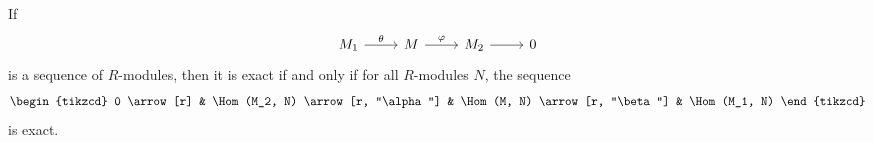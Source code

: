 If
\[\begin{tikzcd}
M_1 \arrow[r, "\theta"] & M \arrow[r, "\varphi"] & M_2 \arrow[r] & 0
\end{tikzcd}\]
is a sequence of $R$-modules, then it is exact if and only if for all
$R$-modules $N$, the sequence
\[\begin{tikzcd}
	0 \arrow[r] & \Hom(M_2, N) \arrow[r, "\alpha"] & \Hom(M, N) \arrow[r, "\beta"] & \Hom(M_1, N)
\end{tikzcd}\]
is exact.
